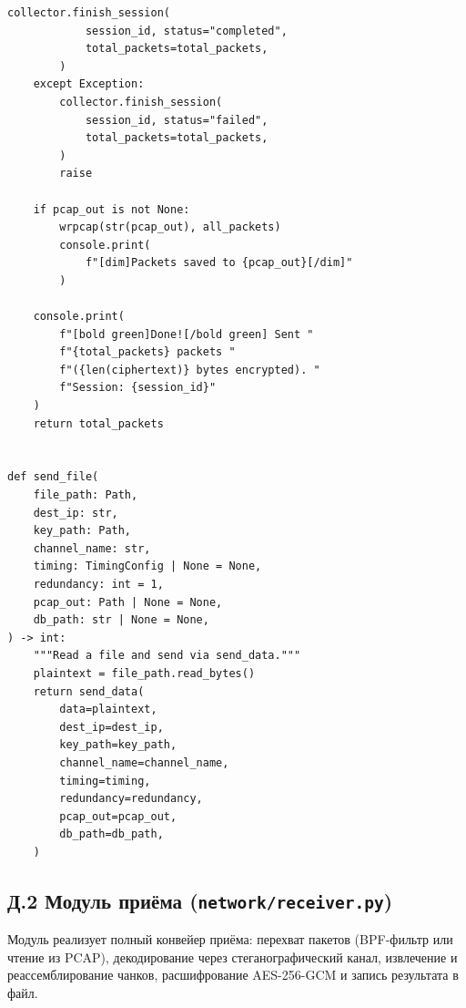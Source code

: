 \begin{lstlisting}[style=appendixcode]
        collector.finish_session(
            session_id, status="completed",
            total_packets=total_packets,
        )
    except Exception:
        collector.finish_session(
            session_id, status="failed",
            total_packets=total_packets,
        )
        raise

    if pcap_out is not None:
        wrpcap(str(pcap_out), all_packets)
        console.print(
            f"[dim]Packets saved to {pcap_out}[/dim]"
        )

    console.print(
        f"[bold green]Done![/bold green] Sent "
        f"{total_packets} packets "
        f"({len(ciphertext)} bytes encrypted). "
        f"Session: {session_id}"
    )
    return total_packets


def send_file(
    file_path: Path,
    dest_ip: str,
    key_path: Path,
    channel_name: str,
    timing: TimingConfig | None = None,
    redundancy: int = 1,
    pcap_out: Path | None = None,
    db_path: str | None = None,
) -> int:
    """Read a file and send via send_data."""
    plaintext = file_path.read_bytes()
    return send_data(
        data=plaintext,
        dest_ip=dest_ip,
        key_path=key_path,
        channel_name=channel_name,
        timing=timing,
        redundancy=redundancy,
        pcap_out=pcap_out,
        db_path=db_path,
    )
\end{lstlisting}

\newpage
\subsection*{Д.2 Модуль приёма (\texttt{network/receiver.py})}

Модуль реализует полный конвейер приёма: перехват пакетов (BPF-фильтр
или чтение из PCAP), декодирование через стеганографический канал,
извлечение и реассемблирование чанков, расшифрование AES-256-GCM
и запись результата в файл.

